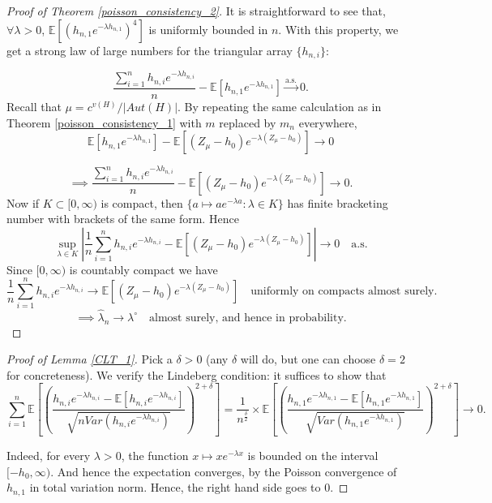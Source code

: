 \documentclass[12pt]{article}
\numberwithin{equation}{section}
\begin{document}
\begin{proof}[Proof of Theorem \ref{poisson_consistency_2}]
It is  straightforward to see that, $\forall \lambda > 0$, $\mathbb{E} \left[ (h_{n,1} e^{-\lambda h_{n,1}})^4 \right]$ is uniformly bounded in $n$. With this property, we get a strong law of large numbers for the triangular array \(\{h_{n,i}\}\):

\[
\frac{\sum_{i=1}^n h_{n,i} e^{-\lambda h_{n,i}}}{n} - \mathbb{E}\left[h_{n,1} e^{-\lambda h_{n,1}}\right] \xrightarrow{\text{a.s.}} 0.
\]
Recall that $\mu=c^{v(H)}/\lvert Aut(H)\rvert$. By repeating the same calculation as in Theorem \ref{poisson_consistency_1} with \(m\) replaced by \(m_n\) everywhere, 
\[
\mathbb{E}\left[h_{n,1} e^{-\lambda h_{n,1}}\right] - \mathbb{E}\left[(Z_{\mu}-h_0)e^{-\lambda(Z_{\mu}-h_0)}\right]\to 0
\]

\[
\implies \frac{\sum_{i=1}^n h_{n,i} e^{-\lambda h_{n,i}}}{n} - \mathbb{E}\left[(Z_{\mu}-h_0)e^{-\lambda(Z_{\mu}-h_0)}\right]\to 0.
\]
Now if $K \subset [0, \infty)$ is compact, then $\{a \mapsto a e^{-\lambda a} : \lambda \in K\}$ has finite bracketing number with brackets of the same form. Hence
\[
\sup_{\lambda \in K} \left\lvert\frac{1}{n} \sum_{i=1}^n h_{n,i} e^{-\lambda h_{n,i}} - \mathbb{E}\left[(Z_{\mu}-h_0)e^{-\lambda(Z_{\mu}-h_0)}\right]\right\rvert\to 0 \quad \text{a.s.}
\]
Since $[0, \infty)$ is countably compact we have
\[
\frac{1}{n} \sum_{i=1}^n h_{n,i} e^{-\lambda h_{n,i}} \to \mathbb{E}\left[(Z_{\mu}-h_0)e^{-\lambda(Z_{\mu}-h_0)}\right] \quad \text{uniformly on compacts almost surely.}
\]
\[
\implies \hat{\lambda}_n \to \lambda^{\circ} \quad \text{almost surely, and hence in probability.}
\]



\end{proof}

\begin{proof}[Proof of Lemma \ref{CLT_1}]
    Pick a \(\delta>0\) (any \(\delta\) will do, but one can choose \(\delta = 2\) for concreteness). We verify the Lindeberg condition: it suffices to show that
    \[\sum_{i=1}^n\mathbb{E}\left[\left(\frac{h_{n,i} e^{-\lambda h_{n,i}} - \mathbb{E}[h_{n,i} e^{-\lambda h_{n,i}}]}{\sqrt{n Var(h_{n,i} e^{-\lambda h_{n,i}})}}\right)^{2+\delta}\right] = \frac{1}{n^{\frac{\delta}{2}}}\times \mathbb{E}\left[\left(\frac{h_{n,1} e^{-\lambda h_{n,1}} - \mathbb{E}[h_{n,1} e^{-\lambda h_{n,1}}]}{\sqrt{Var(h_{n,1} e^{-\lambda h_{n,1}})}}\right)^{2+\delta}\right]\rightarrow 0.\]

    Indeed, for every \(\lambda>0\), the function \(x\mapsto xe^{-\lambda x}\) is bounded on the interval \([-h_0,\infty)\). And hence the expectation converges, by the Poisson convergence of \(h_{n,1}\) in total variation norm. Hence, the right hand side goes to \(0\).
\end{proof}
\end{document}
